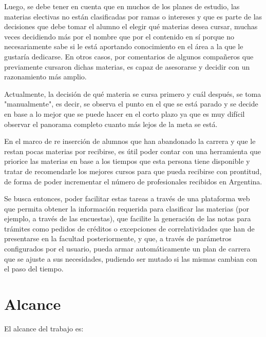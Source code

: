 \documentclass[a4paper]{article}
\begin{document}
Luego, se debe tener en cuenta que en muchos de los planes de estudio, las materias electivas no están clasificadas por ramas o intereses y que es parte de las decisiones que debe tomar el alumno el elegir qué materias desea cursar, muchas veces decidiendo más por el nombre que por el contenido en sí porque no necesariamente sabe si le está aportando conocimiento en el área a la que le gustaría dedicarse. En otros casos, por comentarios de algunos compañeros que previamente cursaron dichas materias, es capaz de asesorarse y decidir con un razonamiento más amplio.

Actualmente, la decisión de qué materia se cursa primero y cuál después, se toma "manualmente", es decir, se observa el punto en el que se está parado y se decide en base a lo mejor que se puede hacer en el corto plazo ya que es muy difícil observar el panorama completo cuanto más lejos de la meta se está.

En el marco de re inserción de alumnos que han abandonado la carrera y que le restan pocas materias por recibirse, es útil poder contar con una herramienta que priorice las materias en base a los tiempos que esta persona tiene disponible y tratar de recomendarle los mejores cursos para que pueda recibirse con prontitud, de forma de poder incrementar el número de profesionales recibidos en Argentina.

Se busca entonces, poder facilitar estas tareas a través de una plataforma web que permita obtener la información requerida para clasificar las materias (por ejemplo, a través de las encuestas), que facilite la generación de las notas para trámites como pedidos de créditos o excepciones de correlatividades que han de presentarse en la facultad posteriormente, y que, a través de parámetros configurados por el usuario, pueda armar automáticamente un plan de carrera que se ajuste a sus necesidades, pudiendo ser mutado si las mismas cambian con el paso del tiempo.

\section{Alcance}

El alcance del trabajo es:
\end{document}

